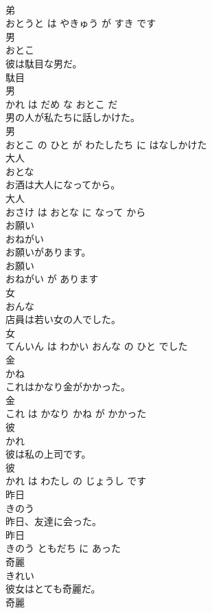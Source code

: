 \documentclass[8pt]{extreport}
\begin{document}
\begin{CJK}{UTF8}{min}
\\	弟 
\\	おとうと は やきゅう が すき です			
\\	男	
\\	おとこ			
\\	彼は駄目な男だ。	
\\	駄目 
\\	男 
\\	かれ は だめ な おとこ だ			
\\	男の人が私たちに話しかけた。	
\\	男 
\\	おとこ の ひと が わたしたち に はなしかけた			
\\	大人	
\\	おとな			
\\	お酒は大人になってから。	
\\	大人 
\\	おさけ は おとな に なって から			
\\	お願い	
\\	おねがい			
\\	お願いがあります。	
\\	お願い 
\\	おねがい が あります			
\\	女	
\\	おんな			
\\	店員は若い女の人でした。	
\\	女 
\\	てんいん は わかい おんな の ひと でした			
\\	金	
\\	かね			
\\	これはかなり金がかかった。	
\\	金 
\\	これ は かなり かね が かかった			
\\	彼	
\\	かれ			
\\	彼は私の上司です。	
\\	彼 
\\	かれ は わたし の じょうし です			
\\	昨日	
\\	きのう			
\\	昨日、友達に会った。	
\\	昨日 
\\	きのう ともだち に あった			
\\	奇麗	
\\	きれい			
\\	彼女はとても奇麗だ。	
\\	奇麗 

\end{CJK}
\end{document}
